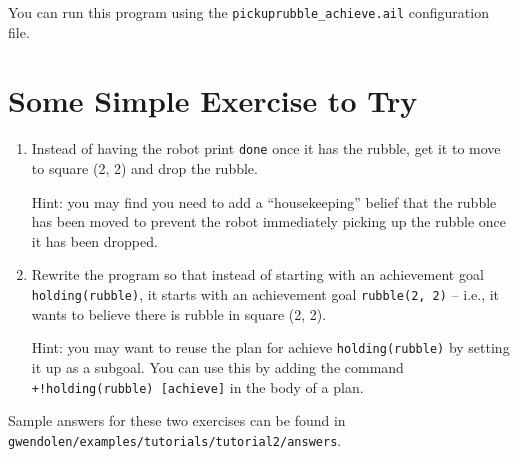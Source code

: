 \documentclass[a4]{article}
\begin{document}
You can run this program using the \lstinline{pickuprubble_achieve.ail} configuration file.

\section{Some Simple Exercise to Try}
\begin{enumerate}
\item Instead of having the robot print \lstinline{done} once it has the rubble, get it to move to square (2, 2) and drop the rubble.  

Hint: you may find  you need to add a ``housekeeping'' belief that the rubble has been moved to prevent the robot immediately picking up the rubble once it has been dropped.
\item Rewrite the program so that instead of starting with an achievement goal \lstinline{holding(rubble)}, it starts with an achievement goal \lstinline{rubble(2, 2)} -- i.e., it wants to believe there is rubble in square (2, 2).

Hint: you may want to reuse the plan for achieve \lstinline{holding(rubble)} by setting it up as a subgoal.  You can use this by adding the command \lstinline{+!holding(rubble) [achieve]} in the body of a plan.
\end{enumerate}
\begin{sloppypar}
Sample answers for these two exercises can be found in \texttt{gwendolen/examples/tutorials/tutorial2/answers}.
\end{sloppypar}
\end{document}
